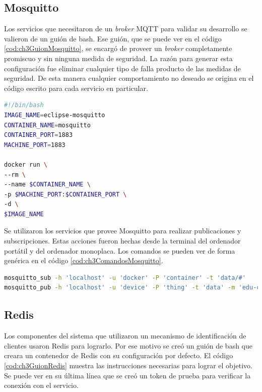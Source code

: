 \subsection{Mosquitto}

Los servicios que necesitaron de un \emph{broker} MQTT para validar su desarrollo se valieron de un guión de bash.
Ese guión, que se puede ver en el código \ref{cod:ch3GuionMosquitto}, se encargó de proveer un \emph{broker} completamente promiscuo y sin ninguna medida de seguridad.
La razón para generar esta configuración fue eliminar cualquier tipo de falla producto de las medidas de seguridad.
De esta manera cualquier comportamiento no deseado se origina en el código escrito para cada servicio en particular.

\begin{lstlisting}[language=bash,label=cod:ch3GuionMosquitto,caption=Guión de Mosquitto.]
#!/bin/bash
IMAGE_NAME=eclipse-mosquitto
CONTAINER_NAME=mosquitto
CONTAINER_PORT=1883
MACHINE_PORT=1883

docker run \
--rm \
--name $CONTAINER_NAME \
-p $MACHINE_PORT:$CONTAINER_PORT \
-d \
$IMAGE_NAME
\end{lstlisting}

Se utilizaron los servicios que provee Mosquitto para realizar publicaciones y subscripciones.
Estas acciones fueron hechas desde la terminal del ordenador portátil y del ordenador monoplaca.
Los comandos se pueden ver de forma genérica en el código \ref{cod:ch3ComandosMosquitto}.

\begin{lstlisting}[language=bash,label=cod:ch3ComandosMosquitto,caption=Comandos de Mosquitto.]
mosquitto_sub -h 'localhost' -u 'docker' -P 'container' -t 'data/#'
mosquitto_pub -h 'localhost' -u 'device' -P 'thing' -t 'data' -m 'edu-ciaa,25'
\end{lstlisting}

\subsection{Redis}

Los componentes del sistema que utilizaron un mecanismo de identificación de clientes usaron Redis para lograrlo.
Por ese motivo se creó un guión de bash que creara un contenedor de Redis con su configuración por defecto.
El código \ref{cod:ch3GuionRedis} muestra las instrucciones necesarias para lograr el objetivo.
Se puede ver en su última línea que se creó un token de prueba para verificar la conexión con el servicio.

